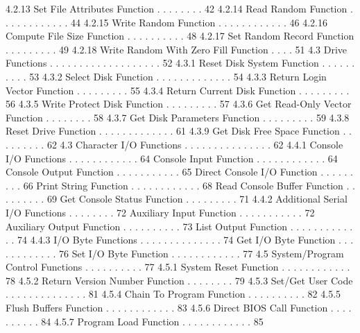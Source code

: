         4.2.13  Set File Attributes Function  . . . . . . . .  42 
        4.2.14  Read Random Function  . . . . . . . . . . . .  44 
        4.2.15  Write Random Function . . . . . . . . . . . .  46 
        4.2.16 Compute File Size Function . . . . . . . . . .  48 
        4.2.17  Set Random Record Function  . . . . . . . . .  49 
        4.2.18  Write Random With Zero Fill Function  . . . .  51 
   4.3 Drive Functions  . . . . . . . . . . . . . . . . . . .  52 
        4.3.1  Reset Disk System Function . . . . . . . . . .  53 
        4.3.2  Select Disk Function . . . . . . . . . . . . .  54 
        4.3.3  Return Login Vector Function . . . . . . . . .  55 
        4.3.4  Return Current Disk Function . . . . . . . . .  56 
        4.3.5  Write Protect Disk Function  . . . . . . . . .  57 
        4.3.6  Get Read-Only Vector Function  . . . . . . . .  58 
        4.3.7 Get Disk Parameters Function  . . . . . . . . .  59 
        4.3.8  Reset Drive Function . . . . . . . . . . . . .  61 
        4.3.9  Get Disk Free Space Function . . . . . . . . .  62 
   4.3 Character I/O Functions  . . . . . . . . . . . . . . .  62 
        4.4.1  Console I/O Functions  . . . . . . . . . . . .  64 
               Console Input Function . . . . . . . . . . . .  64 
               Console Output Function  . . . . . . . . . . .  65 
               Direct Console I/O Function  . . . . . . . . .  66 
               Print String Function  . . . . . . . . . . . .  68 
               Read Console Buffer Function . . . . . . . . .  69 
               Get Console Status Function  . . . . . . . . .  71 
        4.4.2 Additional Serial I/O Functions . . . . . . . .  72 
               Auxiliary Input Function . . . . . . . . . . .  72 
               Auxiliary Output Function  . . . . . . . . . .  73 
               List Output Function . . . . . . . . . . . . .  74 
        4.4.3  I/O Byte Functions . . . . . . . . . . . . . .  74 
               Get I/O Byte Function  . . . . . . . . . . . .  76 
               Set I/O Byte Function  . . . . . . . . . . . .  77 
   4.5  System/Program Control Functions  . . . . . . . . . .  77 
        4.5.1  System Reset Function  . . . . . . . . . . . .  78 
        4.5.2  Return Version Number Function . . . . . . . .  79 
        4.5.3  Set/Get User Code  . . . . . . . . . . . . . .  81 
        4.5.4  Chain To Program Function  . . . . . . . . . .  82 
        4.5.5  Flush Buffers Function . . . . . . . . . . . .  83 
        4.5.6  Direct BIOS Call Function  . . . . . . . . . .  84 
        4.5.7  Program Load Function  . . . . . . . . . . . .  85 
